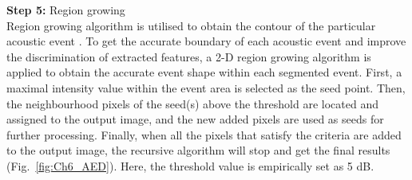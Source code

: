 \noindent \textbf{Step 5:} Region growing
\\
Region growing algorithm is utilised to obtain the contour of the particular acoustic event \cite{mallawaarachchi2008spectrogram}. To get the accurate boundary of each acoustic event and improve the discrimination of extracted features, a 2-D region growing algorithm is applied to obtain the accurate event shape within each segmented event. First, a maximal intensity value within the event area is selected as the seed point. Then, the neighbourhood pixels of the seed(s) above the threshold are located and assigned to the output image, and the new added pixels are used as seeds for further processing. Finally, when all the pixels that satisfy the criteria are added to the output image, the recursive algorithm will stop and get the final results (Fig.~\ref{fig:Ch6_AED}). Here, the threshold value is empirically set as 5 dB.

